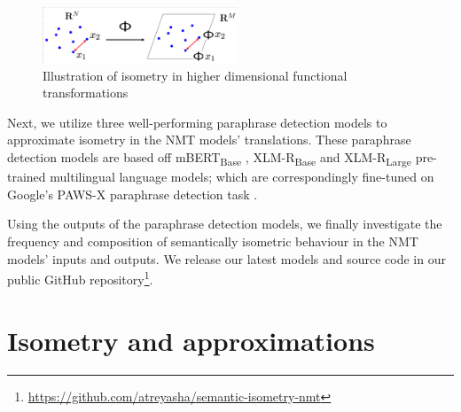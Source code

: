 \documentclass[11pt,a4paper]{article}
\begin{document}
\begin{figure}
  \centering
  \includegraphics[trim={1.0cm 0cm 0cm 1.0cm},clip,width=0.52\textwidth]{isometry_visualized.png}
  \caption{Illustration of isometry in higher dimensional functional transformations \citep{Hegde-Numax}}
  \label{isometry_visual}
\end{figure}

Next, we utilize three well-performing paraphrase detection models to approximate isometry in the NMT models' translations. These paraphrase detection models are based off mBERT\textsubscript{Base} \cite{devlin-etal-2019-bert}, XLM-R\textsubscript{Base} \cite{conneau2019unsupervised} and XLM-R\textsubscript{Large} \cite{conneau2019unsupervised} pre-trained multilingual language models; which are correspondingly fine-tuned on Google's PAWS-X paraphrase detection task \cite{pawsx2019emnlp, hu2020xtreme}.
 
Using the outputs of the paraphrase detection models, we finally investigate the frequency and composition of semantically isometric behaviour in the NMT models' inputs and outputs. We release our latest models and source code in our public GitHub repository\footnote{\url{https://github.com/atreyasha/semantic-isometry-nmt}}.


\section{Isometry and approximations}
\end{document}
